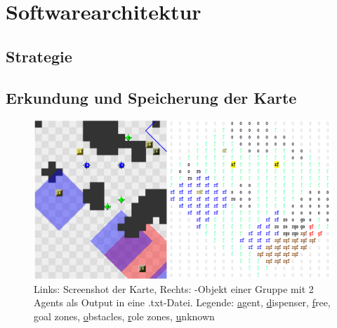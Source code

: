 \section{Softwarearchitektur}

\subsection{Strategie}

\subsection{Erkundung und Speicherung der Karte} \label{erkundungDerKarte}

\begin{figure}[h]
    \includegraphics[width=1.0\textwidth]{./Abbildungen/map.png}
    \centering
    \caption{Links: Screenshot der Karte, Rechts: \NextMap-Objekt einer Gruppe mit 2 Agents als Output in eine .txt-Datei. \newline Legende: \underline{a}gent, \underline{d}ispenser, \underline{f}ree, \underline{g}oal zones, \underline{o}bstacles, \underline{r}ole zones, \underline{u}nknown}
\end{figure}

